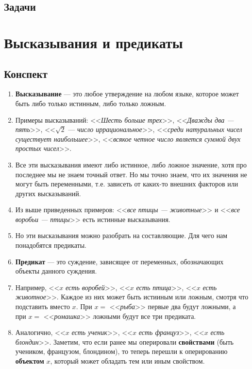 \subsection{Задачи}

\section{Высказывания и предикаты}

\subsection{Конспект}
\begin{enumerate}\setlength{\itemsep}{1pt}
\item \textbf{Высказывание} --- это любое утверждение на любом языке, которое может быть либо только истинным, либо только ложным.
\item Примеры высказываний: <<\textit{Шесть больше трех}>>, <<\textit{Дважды два --- пять}>>, <<$\sqrt 2$ --- \textit{число иррациональное}>>, <<\textit{среди натуральных чисел существует наибольшее}>>, <<\textit{всякое четное число является суммой двух простых чисел}>>.
\item Все эти высказывания имеют либо истинное, либо ложное значение, хотя про последнее мы не знаем точный ответ. Но мы точно знаем, что их значения не могут быть переменными, т.е. зависеть от каких-то внешних факторов или других высказываний.
\item Из выше приведенных примеров: <<\textit{все птицы --- животные}>> и <<\textit{все воробьи --- птицы}>> есть истинные высказывания.
\item Но эти высказывания можно разобрать на составляющие. Для чего нам понадобятся предикаты.
\item \textbf{Предикат} --- это суждение, зависящее от переменных, обозначающих объекты данного суждения.
\item Например, <<$x$ \textit{есть воробей}>>, <<$x$ \textit{есть птица}>>, <<$x$ \textit{есть животное}>>. Каждое из них может быть истииным или ложным, смотря что подставить вместо $x$. При $x=$ <<\textit{рыба}>> первые два будут ложными, а при $x=$ <<\textit{ромашка}>> ложными будут все три предиката.
\item Аналогично, <<$x$ \textit{есть ученик}>>, <<$x$ \textit{есть француз}>>, <<$x$ \textit{есть блондин}>>. Заметим, что если ранее мы оперировали \textbf{свойствами} (быть учеником, французом, блондином), то теперь перешли к оперированию \textbf{объектом} $x$, который может обладать тем или иным свойством.

\end{enumerate}
